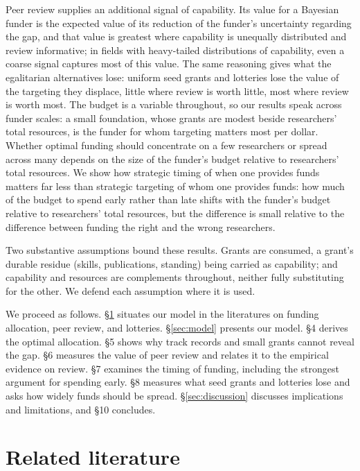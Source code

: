 \documentclass[article, 11pt, reqno]{amsart}
\theoremstyle{named}
\begin{document}
Peer review supplies an additional signal of capability. Its value for a Bayesian funder
is the expected value of its reduction of the funder's uncertainty regarding the gap, and
that value is greatest where capability is unequally distributed and review informative; in
fields with heavy-tailed distributions of capability, even a coarse signal captures most of
this value. The same reasoning gives what the egalitarian alternatives lose: uniform seed
grants and lotteries lose the value of the targeting they displace, little where review is
worth little, most where review is worth most. The budget is a variable throughout,
so our results speak across funder scales: a small foundation, whose grants are modest
beside researchers' total resources, is the funder for whom targeting matters most per
dollar. Whether optimal funding should concentrate on a few researchers or spread across many
depends on the size of the funder's budget relative to researchers' total resources. We show
how strategic timing of when one provides funds matters far less than strategic targeting
of whom one provides funds: how much of the budget to spend early rather than late shifts
with the funder's budget relative to researchers' total resources, but the difference is
small relative to the difference between funding the right and the wrong researchers.

Two substantive assumptions bound these results. Grants are consumed, a grant's durable
residue (skills, publications, standing) being carried as capability; and capability and
resources are complements throughout, neither fully substituting for the other. We defend
each assumption where it is used.

We proceed as follows. \S\ref{sec:literature} situates our model in the literatures on
funding allocation, peer review, and lotteries. \S\ref{sec:model} presents our model. \S4 derives the
optimal allocation. \S5 shows why track records and small grants cannot reveal the gap.
\S6 measures the value of peer review and relates it to the empirical evidence on review.
\S7 examines the timing of funding, including the strongest argument for spending early.
\S8 measures what seed grants and lotteries lose and asks how widely funds should be
spread. \S\ref{sec:discussion} discusses implications and limitations, and \S10
concludes.

\section{Related literature}\label{sec:literature}
\end{document}
